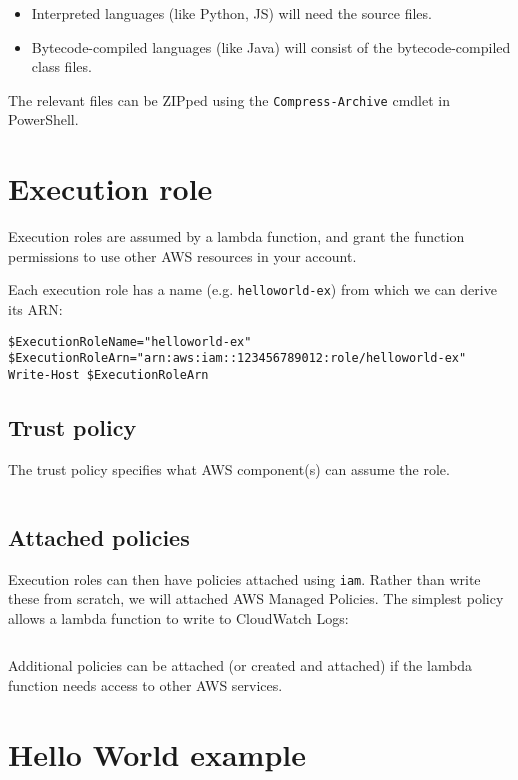 \documentclass[slides]{pgnotes}
\begin{document}
\begin{itemize}
\item
  Interpreted languages (like Python, JS) will need the source files.
\item
  Bytecode-compiled languages (like Java) will consist of the
  bytecode-compiled class files.
\end{itemize}

The relevant files can be ZIPped using the \texttt{Compress-Archive} cmdlet in PowerShell.

\section{Execution role}\label{execution-role}

Execution roles are assumed by a lambda function, and grant the function
permissions to use other AWS resources in your account.

Each execution role has a name (e.g. \texttt{helloworld-ex}) from which
we can derive its ARN:

\begin{verbatim}
$ExecutionRoleName="helloworld-ex"
$ExecutionRoleArn="arn:aws:iam::123456789012:role/helloworld-ex"
Write-Host $ExecutionRoleArn
\end{verbatim}

\subsection{Trust policy}\label{sec:trust-policy}

The trust policy specifies what AWS component(s) can assume the role.

\inputminted{json}{trust_policy.json}

\subsection{Attached policies}\label{attached-policies}

Execution roles can then have policies attached using \texttt{iam}.
Rather than write these from scratch, we will attached AWS Managed
Policies. The simplest policy allows a lambda function to write to
CloudWatch Logs:

\inputminted{json}{AWSLambdaBasicExecutionRole.json}

Additional policies can be attached (or created and attached) if the
lambda function needs access to other AWS services.

\section{Hello World example}\label{hello-world-example}
\end{document}

